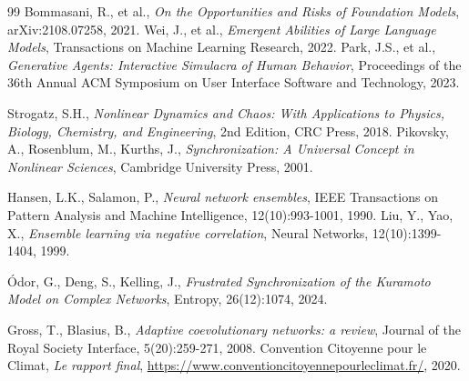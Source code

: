 \documentclass[11pt]{article}
\begin{document}
\begin{thebibliography}{99}
 Bommasani, R., et al., \emph{On the Opportunities and Risks of Foundation Models}, arXiv:2108.07258, 2021.
 Wei, J., et al., \emph{Emergent Abilities of Large Language Models}, Transactions on Machine Learning Research, 2022.
 Park, J.S., et al., \emph{Generative Agents: Interactive Simulacra of Human Behavior}, Proceedings of the 36th Annual ACM Symposium on User Interface Software and Technology, 2023.

 Strogatz, S.H., \emph{Nonlinear Dynamics and Chaos: With Applications to Physics, Biology, Chemistry, and Engineering}, 2nd Edition, CRC Press, 2018.
 Pikovsky, A., Rosenblum, M., Kurths, J., \emph{Synchronization: A Universal Concept in Nonlinear Sciences}, Cambridge University Press, 2001.

 Hansen, L.K., Salamon, P., \emph{Neural network ensembles}, IEEE Transactions on Pattern Analysis and Machine Intelligence, 12(10):993-1001, 1990.
 Liu, Y., Yao, X., \emph{Ensemble learning via negative correlation}, Neural Networks, 12(10):1399-1404, 1999.

 Ódor, G., Deng, S., Kelling, J., \emph{Frustrated Synchronization of the Kuramoto Model on Complex Networks}, Entropy, 26(12):1074, 2024.

 Gross, T., Blasius, B., \emph{Adaptive coevolutionary networks: a review}, Journal of the Royal Society Interface, 5(20):259-271, 2008.
 Convention Citoyenne pour le Climat, \emph{Le rapport final}, \url{https://www.conventioncitoyennepourleclimat.fr/}, 2020.
\end{thebibliography}
\end{document}

